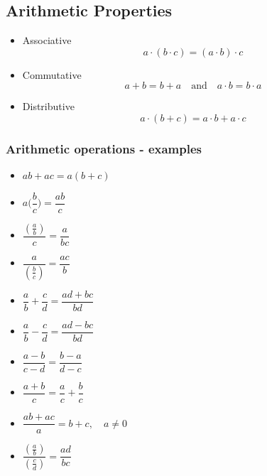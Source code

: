 \documentclass[12pt, a5paper]{article}
\begin{document}
\subsection*{Arithmetic Properties}

\begin{itemize}
\item{Associative $$a \cdot (b \cdot c) = (a \cdot b) \cdot c$$}
\item{Commutative $$a + b = b + a \quad\text{and}\quad a \cdot b = b \cdot a$$}
\item{Distributive $$a \cdot (b + c) = a \cdot b + a \cdot c$$}
\end{itemize}

\subsubsection*{Arithmetic operations - examples}
\begin{itemize}
\item{$ab + ac = a (b + c)$}
\item{$a\Big(\dfrac{b}{c}\Big) = \dfrac{ab}{c}$}
\item{$\dfrac{(\frac{a}{b})}{c} = \dfrac{a}{bc}$}
\item{$\dfrac{a}{(\frac{b}{c})}= \dfrac{ac}{b}$}
\item{$\dfrac{a}{b} + \dfrac{c}{d} = \dfrac{ad + bc}{bd}$}
\item{$\dfrac{a}{b} - \dfrac{c}{d} = \dfrac{ad - bc}{bd}$}
\item{$\dfrac{a - b}{c - d} = \dfrac{b - a}{d - c}$}
\item{$\dfrac{a + b}{c} = \dfrac{a}{c} + \dfrac{b}{c}$}
\item{$\dfrac{ab + ac}{a} = b + c,\quad a \ne 0$}
\item{$\dfrac{(\frac{a}{b})}{(\frac{c}{d})} = \dfrac{ad}{bc}$}
\end{itemize}
\end{document}
